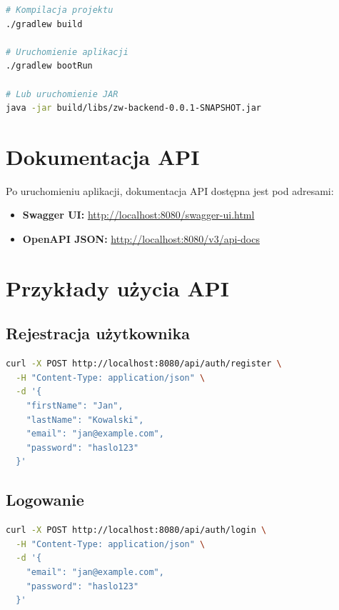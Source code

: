 \documentclass[12pt,a4paper]{report}
\begin{document}
\begin{lstlisting}[language=bash, caption={Uruchomienie lokalne}]
# Kompilacja projektu
./gradlew build

# Uruchomienie aplikacji
./gradlew bootRun

# Lub uruchomienie JAR
java -jar build/libs/zw-backend-0.0.1-SNAPSHOT.jar
\end{lstlisting}

\section{Dokumentacja API}

Po uruchomieniu aplikacji, dokumentacja API dostępna jest pod adresami:

\begin{itemize}
    \item \textbf{Swagger UI:} \url{http://localhost:8080/swagger-ui.html}
    \item \textbf{OpenAPI JSON:} \url{http://localhost:8080/v3/api-docs}
\end{itemize}

\section{Przykłady użycia API}

\subsection{Rejestracja użytkownika}

\begin{lstlisting}[language=bash, caption={curl - rejestracja}]
curl -X POST http://localhost:8080/api/auth/register \
  -H "Content-Type: application/json" \
  -d '{
    "firstName": "Jan",
    "lastName": "Kowalski",
    "email": "jan@example.com",
    "password": "haslo123"
  }'
\end{lstlisting}

\subsection{Logowanie}

\begin{lstlisting}[language=bash, caption={curl - logowanie}]
curl -X POST http://localhost:8080/api/auth/login \
  -H "Content-Type: application/json" \
  -d '{
    "email": "jan@example.com",
    "password": "haslo123"
  }'
\end{lstlisting}
\end{document}
